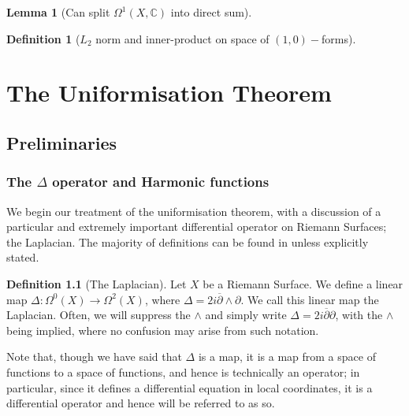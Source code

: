 \documentclass[11pt]{report}
\newtheorem{lemma}[thm]{Lemma}
\theoremstyle{definition}
\newtheorem{defn}[thm]{Definition}
\begin{document}
\begin{lemma}[Can split $\Omega^1(X,\mathbb{C})$ into direct sum]
  
\end{lemma}

\begin{defn}[$L_2$ norm and inner-product on space of $(1,0)-$forms]\label{InnerProduct}
  
\end{defn}
\chapter{The Uniformisation Theorem}
\section{Preliminaries}
\subsection{The $\Delta$ operator and Harmonic functions}
We begin our treatment of the uniformisation theorem, with a discussion of a particular and extremely important differential operator on Riemann Surfaces; the Laplacian. The majority of definitions can be found in \cite{donaldson} unless explicitly stated.

\begin{defn}[The Laplacian]\label{LaplacianDef}
  Let $X$ be a Riemann Surface. We define a linear map $\Delta:\Omega^0(X)\rightarrow \Omega^2(X)$, where $\Delta=2i\overline{\partial}\wedge\partial$. We call this linear map the Laplacian. Often, we will suppress the $\wedge$ and simply write $\Delta=2i\overline{\partial}\partial$, with the $\wedge$ being implied, where no confusion may arise from such notation.
\end{defn}

Note that, though we have said that $\Delta$ is a map, it is a map from a space of functions to a space of functions, and hence is technically an operator; in particular, since it defines a differential equation in local coordinates, it is a differential operator and hence will be referred to as so.
\end{document}
